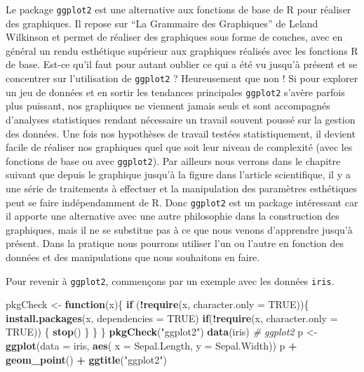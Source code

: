 \documentclass[
]{book}
\newenvironment{Shaded}{\begin{snugshade}}{\end{snugshade}}
\newcommand{\CommentTok}[1]{\textcolor[rgb]{0.56,0.35,0.01}{\textit{#1}}}
\newcommand{\ControlFlowTok}[1]{\textcolor[rgb]{0.13,0.29,0.53}{\textbf{#1}}}
\newcommand{\DataTypeTok}[1]{\textcolor[rgb]{0.13,0.29,0.53}{#1}}
\newcommand{\KeywordTok}[1]{\textcolor[rgb]{0.13,0.29,0.53}{\textbf{#1}}}
\newcommand{\NormalTok}[1]{#1}
\newcommand{\OperatorTok}[1]{\textcolor[rgb]{0.81,0.36,0.00}{\textbf{#1}}}
\newcommand{\OtherTok}[1]{\textcolor[rgb]{0.56,0.35,0.01}{#1}}
\newcommand{\StringTok}[1]{\textcolor[rgb]{0.31,0.60,0.02}{#1}}
\begin{document}
Le package \texttt{ggplot2} est une alternative aux fonctions de base de R pour réaliser des graphiques. Il repose sur ``La Grammaire des Graphiques'' de Leland Wilkinson et permet de réaliser des graphiques sous forme de couches, avec en général un rendu esthétique supérieur aux graphiques réalisés avec les fonctions R de base. Est-ce qu'il faut pour autant oublier ce qui a été vu jusqu'à présent et se concentrer sur l'utilisation de \texttt{ggplot2} ? Heureusement que non ! Si pour explorer un jeu de données et en sortir les tendances principales \texttt{ggplot2} s'avère parfois plus puissant, nos graphiques ne viennent jamais seuls et sont accompagnés d'analyses statistiques rendant nécessaire un travail souvent poussé sur la gestion des données. Une fois nos hypothèses de travail testées statistiquement, il devient facile de réaliser nos graphiques quel que soit leur niveau de complexité (avec les fonctions de base ou avec \texttt{ggplot2}). Par ailleurs nous verrons dans le chapitre suivant que depuis le graphique jusqu'à la figure dans l'article scientifique, il y a une série de traitements à effectuer et la manipulation des paramètres esthétiques peut se faire indépendamment de R. Donc \texttt{ggplot2} est un package intéressant car il apporte une alternative avec une autre philosophie dans la construction des graphiques, mais il ne se substitue pas à ce que nous venons d'apprendre jusqu'à présent. Dans la pratique nous pourrons utiliser l'un ou l'autre en fonction des données et des manipulations que nous souhaitons en faire.

Pour revenir à \texttt{ggplot2}, commençons par un exemple avec les données \texttt{iris}.

\begin{Shaded}
\begin{Highlighting}[]
\NormalTok{pkgCheck <-}\StringTok{ }\ControlFlowTok{function}\NormalTok{(x)\{ }
    \ControlFlowTok{if}\NormalTok{ (}\OperatorTok{!}\KeywordTok{require}\NormalTok{(x, }\DataTypeTok{character.only =} \OtherTok{TRUE}\NormalTok{))\{}
        \KeywordTok{install.packages}\NormalTok{(x, }\DataTypeTok{dependencies =} \OtherTok{TRUE}\NormalTok{)}
        \ControlFlowTok{if}\NormalTok{(}\OperatorTok{!}\KeywordTok{require}\NormalTok{(x, }\DataTypeTok{character.only =} \OtherTok{TRUE}\NormalTok{)) \{}
            \KeywordTok{stop}\NormalTok{()}
\NormalTok{        \}}
\NormalTok{    \}}
\NormalTok{\}}
\KeywordTok{pkgCheck}\NormalTok{(}\StringTok{"ggplot2"}\NormalTok{)}
\KeywordTok{data}\NormalTok{(iris)}
\CommentTok{# ggplot2}
\NormalTok{p <-}\StringTok{ }\KeywordTok{ggplot}\NormalTok{(}\DataTypeTok{data =}\NormalTok{ iris, }\KeywordTok{aes}\NormalTok{(}
  \DataTypeTok{x =}\NormalTok{ Sepal.Length, }
  \DataTypeTok{y =}\NormalTok{ Sepal.Width))}
\NormalTok{p }\OperatorTok{+}\StringTok{ }\KeywordTok{geom_point}\NormalTok{() }\OperatorTok{+}\StringTok{ }\KeywordTok{ggtitle}\NormalTok{(}\StringTok{"ggplot2"}\NormalTok{)}
\end{Highlighting}
\end{Shaded}
\end{document}

